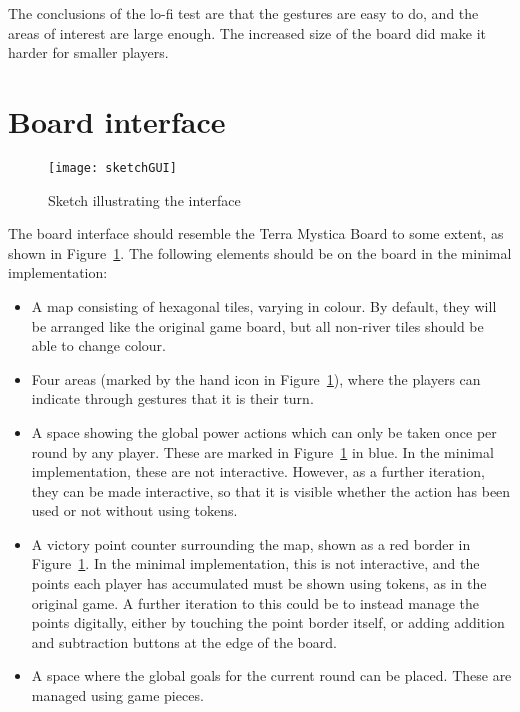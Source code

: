 The conclusions of the lo-fi test are that the gestures are easy to do, and the areas of interest are large enough. The increased size of the board did make it harder for smaller players.

\section{Board interface}\label{sec:BoardInterface}
\begin{figure}
\centering
\texttt{[image: sketchGUI]}
\caption{Sketch illustrating the interface}
\label{fig:sketchGUI}
\end{figure}

The board interface should resemble the Terra Mystica Board to some extent, as shown in Figure~\ref{fig:sketchGUI}. The following elements should be on the board in the minimal implementation:
\begin{itemize}
\item A map consisting of hexagonal tiles, varying in colour. By default, they will be arranged like the original game board, but all non-river tiles should be able to change colour.
\item Four areas (marked by the hand icon in Figure~\ref{fig:sketchGUI}), where the players can indicate through gestures that it is their turn.
\item A space showing the global power actions which can only be taken once per round by any player. These are marked in Figure~\ref{fig:sketchGUI} in blue. In the minimal implementation, these are not interactive. However, as a further iteration, they can be made interactive, so that it is visible whether the action has been used or not without using tokens.
\item A victory point counter surrounding the map, shown as a red border in Figure~\ref{fig:sketchGUI}. In the minimal implementation, this is not interactive, and the points each player has accumulated must be shown using tokens, as in the original game. A further iteration to this could be to instead manage the points digitally, either by touching the point border itself, or adding addition and subtraction buttons at the edge of the board.
\item A space where the global goals for the current round can be placed. These are managed using game pieces.
\end{itemize}

